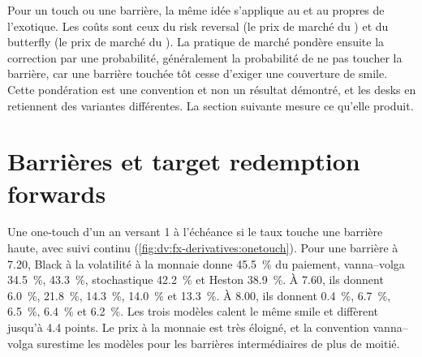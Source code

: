 Pour un touch ou une barrière, la même idée s'applique au  et au  propres de l'exotique. Les coûts sont ceux du risk reversal (le
prix de marché du ) et du butterfly (le prix de marché du ). La pratique de marché pondère ensuite la correction par une probabilité,
généralement la probabilité de ne pas toucher la barrière, car une barrière touchée tôt cesse d'exiger une couverture de smile. Cette pondération est
une convention et non un résultat démontré, et les desks en retiennent des variantes différentes. La section suivante mesure ce qu'elle produit.

\section{Barrières et target redemption forwards}

\begin{example}\label{ex:dv:fx-derivatives:onetouch}
Une one-touch d'un an versant 1 à l'échéance si le taux touche une barrière haute, avec suivi continu (\cref{fig:dv:fx-derivatives:onetouch}).
Pour une barrière à 7.20, Black à la volatilité à la monnaie donne 45.5~\% du paiement, vanna--volga 34.5~\%,  43.3~\%,
 stochastique 42.2~\% et Heston 38.9~\%. À 7.60, ils donnent 6.0~\%, 21.8~\%, 14.3~\%, 14.0~\% et 13.3~\%. À 8.00, ils donnent 0.4~\%,
6.7~\%, 6.5~\%, 6.4~\% et 6.2~\%. Les trois modèles calent le même smile et diffèrent jusqu'à 4.4 points. Le prix à la monnaie est très éloigné,
et la convention vanna--volga surestime les modèles pour les barrières intermédiaires de plus de moitié.
\end{example}

